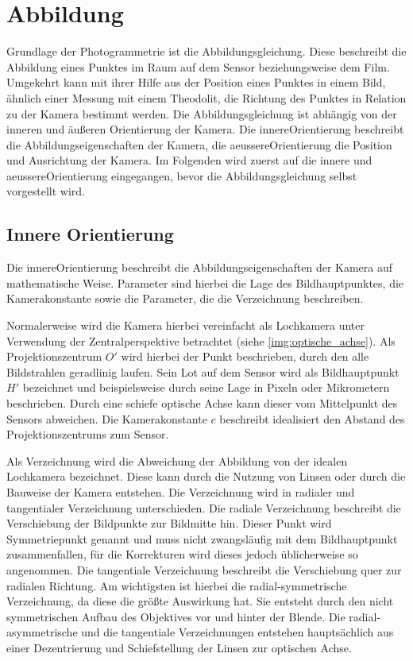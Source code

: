 \documentclass[./00PhotoBox.tex]{subfiles}
\begin{document}
\section{Abbildung}
\label{s:abbildung}
Grundlage der Photogrammetrie ist die Abbildungsgleichung. Diese beschreibt die Abbildung eines Punktes im Raum auf dem Sensor beziehungsweise dem Film. Umgekehrt kann mit ihrer Hilfe aus der Position eines Punktes in einem Bild, ähnlich einer Messung mit einem Theodolit, die Richtung des Punktes in Relation zu der Kamera bestimmt werden. Die Abbildungsgleichung ist abhängig von der inneren und äußeren Orientierung der Kamera. Die \gls{innereOrientierung} beschreibt die Abbildungseigenschaften der Kamera, die \gls{aeussereOrientierung} die Position und Ausrichtung der Kamera. Im Folgenden wird zuerst auf die innere und \gls{aeussereOrientierung} eingegangen, bevor die Abbildungsgleichung selbst vorgestellt wird.

\subsection{Innere Orientierung}
\label{s:innereorientierung}
Die \gls{innereOrientierung} beschreibt die Abbildungseigenschaften der Kamera auf mathematische Weise. Parameter sind hierbei die Lage des \Gls{Bildhauptpunkt}es, die Kamerakonstante sowie die Parameter, die die \Gls{Verzeichnung} beschreiben. \citep[S. 179f]{luhmann}

Normalerweise wird die Kamera hierbei vereinfacht als Lochkamera unter Verwendung der Zentralperspektive betrachtet (siehe \autoref{img:optische_achse}). Als Projektionszentrum $O'$ wird hierbei der Punkt beschrieben, durch den alle Bildstrahlen geradlinig laufen. Sein Lot auf dem Sensor wird als \Gls{Bildhauptpunkt} $H'$ bezeichnet und beispielsweise durch seine Lage in Pixeln oder Mikrometern beschrieben. Durch eine schiefe optische Achse kann dieser vom Mittelpunkt des Sensors abweichen. Die \Gls{Kamerakonstante} $c$ beschreibt idealisiert den Abstand des Projektionszentrums zum Sensor. \citep[S. 177]{luhmann}

Als \Gls{Verzeichnung} wird die Abweichung der Abbildung von der idealen Lochkamera bezeichnet. Diese kann durch die Nutzung von Linsen oder durch die Bauweise der Kamera entstehen. Die \Gls{Verzeichnung} wird in radialer und tangentialer \Gls{Verzeichnung} unterschieden. Die radiale \Gls{Verzeichnung} beschreibt die Verschiebung der Bildpunkte zur Bildmitte hin. Dieser Punkt wird Symmetriepunkt genannt und muss nicht zwangsläufig mit dem Bildhauptpunkt zusammenfallen, für die Korrekturen wird dieses jedoch üblicherweise so angenommen. Die tangentiale \Gls{Verzeichnung} beschreibt die Verschiebung quer zur radialen Richtung. Am wichtigsten ist hierbei die radial-symmetrische \Gls{Verzeichnung}, da diese die größte Auswirkung hat. Sie entsteht durch den nicht symmetrischen Aufbau des Objektives vor und hinter der Blende. Die radial-asymmetrische und die tangentiale \Gls{Verzeichnung}en entstehen hauptsächlich aus einer Dezentrierung und Schiefstellung der Linsen zur optischen Achse. \citep[S. 178]{luhmann}
\end{document}
